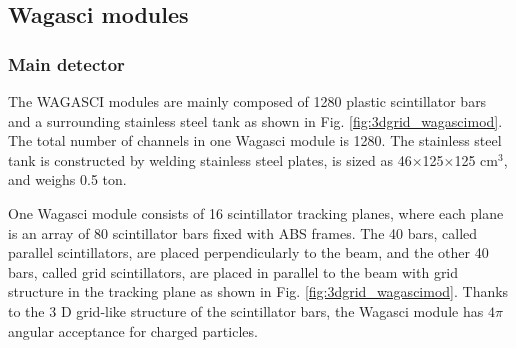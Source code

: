 \subsection{Wagasci modules}
\subsubsection{Main detector}
The WAGASCI modules are mainly composed of 1280 plastic scintillator bars and a surrounding stainless steel tank as shown in Fig. \ref{fig:3dgrid_wagascimod}.
The total number of channels in one Wagasci module is 1280.
The stainless steel tank is constructed by welding stainless steel plates, is sized as 46$\times$125$\times$125 cm$^{3}$, and weighs 0.5 ton. 


One Wagasci module consists of 16 scintillator tracking planes, where each plane is an array of 80 scintillator bars fixed with ABS frames.
The 40 bars, called parallel scintillators, are placed perpendicularly to the beam, and the other 40 bars, called grid scintillators, are placed in parallel to the beam with grid structure in the tracking plane as shown in Fig. \ref{fig:3dgrid_wagascimod}.
Thanks to the 3 D grid-like structure of the scintillator bars, 
the Wagasci module has $4\pi$ angular acceptance for charged particles.

